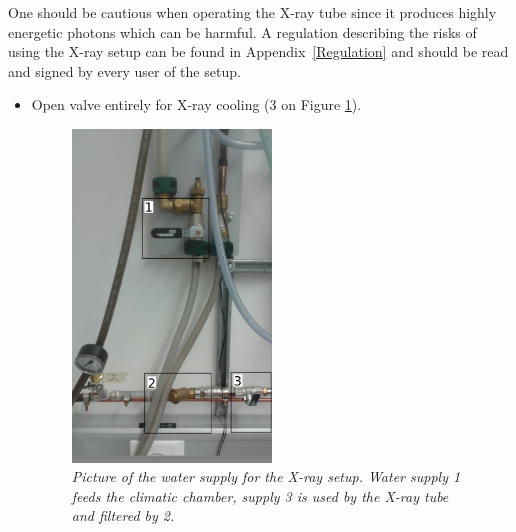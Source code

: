 \documentclass[a4paper,12pt,twoside]{article}
\begin{document}
One should be cautious when operating the X-ray tube since it produces highly energetic photons which can be harmful. A regulation describing the risks of using the X-ray setup can be found in Appendix~\ref{Regulation} and should be read and signed by every user of the setup.

\begin{itemize}
\item {Open valve entirely for X-ray cooling (3 on Figure \ref{Water}).
\begin{figure} [h!] \centering
\includegraphics[width=0.5\textwidth, angle=0] {./Figures/Water2.jpg}
\caption{\em  \label{Water}
Picture of the water supply for the X-ray setup. Water supply 1 feeds the climatic chamber, supply 3 is used by the X-ray tube and filtered by 2.}
\end{figure}
}


\end{itemize}
\end{document}
